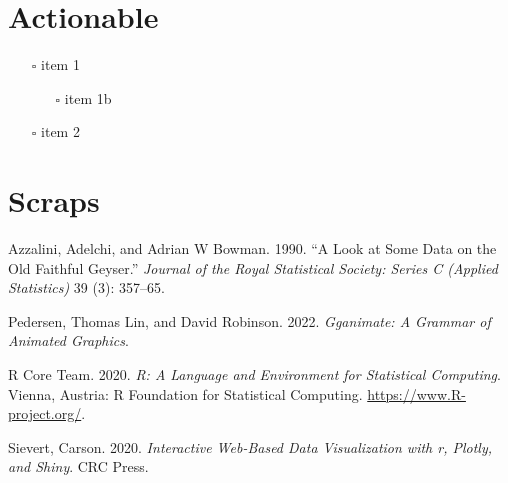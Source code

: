 \documentclass[
]{article}
\providecommand{\tightlist}{%
  \setlength{\itemsep}{0pt}\setlength{\parskip}{0pt}}
\newlength{\cslhangindent}
\newlength{\cslentryspacingunit} %
\newenvironment{CSLReferences}[2] %
 {%
  \setlength{\parindent}{0pt}
  \ifodd #1
  \let\oldpar\par
  \def\par{\hangindent=\cslhangindent\oldpar}
  \fi
  \setlength{\parskip}{#2\cslentryspacingunit}
 }%
 {}
\begin{document}
\hypertarget{actionable}{%
\section{Actionable}\label{actionable}}

\begin{itemize}
\item[$\square$]
  item 1

  \begin{itemize}
  \tightlist
  \item[$\square$]
    item 1b
  \end{itemize}
\item[$\square$]
  item 2
\end{itemize}

\hypertarget{scraps}{%
\section*{Scraps}\label{scraps}}

\hypertarget{refs}{}
\begin{CSLReferences}{1}{0}
\leavevmode{}%
Azzalini, Adelchi, and Adrian W Bowman. 1990. {``A Look at Some Data on
the Old Faithful Geyser.''} \emph{Journal of the Royal Statistical
Society: Series C (Applied Statistics)} 39 (3): 357--65.

\leavevmode{}%
Pedersen, Thomas Lin, and David Robinson. 2022. \emph{Gganimate: A
Grammar of Animated Graphics}.

\leavevmode{}%
R Core Team. 2020. \emph{R: A Language and Environment for Statistical
Computing}. Vienna, Austria: R Foundation for Statistical Computing.
\url{https://www.R-project.org/}.

\leavevmode{}%
Sievert, Carson. 2020. \emph{Interactive Web-Based Data Visualization
with r, Plotly, and Shiny}. CRC Press.

\end{CSLReferences}
\end{document}

